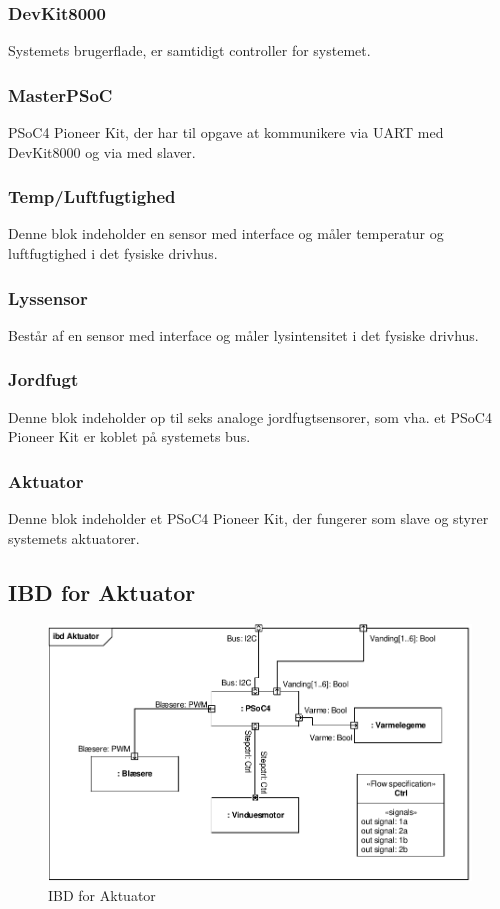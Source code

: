 \subsubsection{DevKit8000}
Systemets brugerflade, er samtidigt controller for systemet. 
\subsubsection{MasterPSoC}
PSoC4 Pioneer Kit, der har til opgave at kommunikere via UART med DevKit8000 og via \IIC med slaver.  
\subsubsection{Temp/Luftfugtighed}
Denne blok indeholder en sensor med \IIC interface og måler temperatur og luftfugtighed i det fysiske drivhus.
\subsubsection{Lyssensor}
Består af en sensor med \IIC interface og måler lysintensitet i det fysiske drivhus. 
\subsubsection{Jordfugt}
Denne blok indeholder op til seks analoge jordfugtsensorer, som vha. et PSoC4 Pioneer Kit er koblet på systemets \IIC bus.
\subsubsection{Aktuator}
Denne blok indeholder et PSoC4 Pioneer Kit, der fungerer som \IIC slave og styrer systemets aktuatorer. 

\subsection{IBD for Aktuator}

\begin{figure}[h]
\centering 
\includegraphics[width={\textwidth}, trim=0 0 0 0, clip=true] {../fig/ibd_aktuator.pdf}
\caption{IBD for Aktuator}
\label{fig:ibd_aktuator}
\end{figure}

